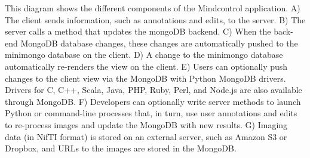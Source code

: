 \label{fig:appstructure}

This diagram shows the different components of the Mindcontrol application. A) The client sends information, such as annotations and edits, to the server. B) The server calls a method that updates the mongoDB backend. C) When the back-end MongoDB database changes, these changes are automatically pushed to the minimongo database on the client. D) A change to the minimongo database automatically re-renders the view on the client. E) Users can optionally push changes to the client view via the MongoDB with Python MongoDB drivers. Drivers for C, C++, Scala, Java, PHP, Ruby, Perl, and Node.js are also available through MongoDB. F) Developers can optionally write server methods to launch Python or command-line processes that, in turn, use user annotations and edits to re-process images and update the MongoDB with new results. G) Imaging data (in NifTI format) is stored on an external server, such as Amazon S3 or Dropbox, and URLs to the images are stored in the MongoDB.